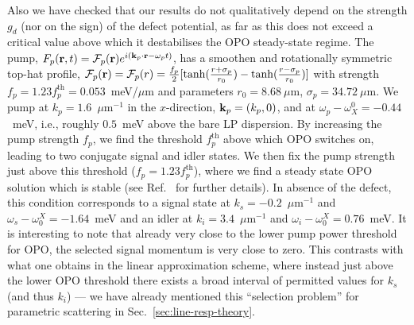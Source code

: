 Also we have checked that our results do not qualitatively depend on
the strength $g_d$ (nor on the sign) of the defect potential, as far
as this does not exceed a critical value above which it destabilises
the OPO steady-state regime.
%
The pump, $F_p(\mathbf{r},t) = \mathcal{F}_p(\mathbf{r}) e^{i (\mathbf{k}_p
  \cdot \mathbf{r} - \omega_p t)}$, has a smoothen and rotationally
symmetric top-hat profile, $\mathcal{F}_p(\mathbf{r}) = \mathcal{F}_p(r)
= \frac{f_p}{2}[\tanh(\frac{r+\sigma_p}{r_0}) -
  \tanh(\frac{r-\sigma_p}{r_0})]$ with strength $f_p = 1.23
f_p^\text{th} = 0.053$~meV/$\mu$m and parameters $r_0 = 8.68~\mu$m,
$\sigma_p = 34.72~\mu$m.
%
We pump at $k_p=1.6$~$\mu$m$^{-1}$ in the $x$-direction, $\mathbf{k}_p =
(k_p,0)$, and at $\omega_p-\omega_X^0=-0.44$~meV, i.e., roughly
$0.5$~meV above the bare LP dispersion. By increasing the pump
strength $f_p$, we find the threshold $f_p^{\text{th}}$ above which
OPO switches on, leading to two conjugate signal and idler states.
%
We then fix the pump strength just above this threshold ($f_p=1.23
f_p^{\text{th}}$), where we find a steady state OPO solution which is
stable (see Ref.~\cite{9783642241857} for further details). In
absence of the defect, this condition corresponds to a signal state at
$k_s=-0.2$~$\mu$m$^{-1}$ and $\omega_s-\omega_0^X = -1.64$~meV and an
idler at $k_i=3.4$~$\mu$m$^{-1}$ and $\omega_i-\omega_0^X =
0.76$~meV. 
%
It is interesting to note that already very close to the lower pump
power threshold for OPO, the selected signal momentum is very close to
zero. This contrasts with what one obtains in the linear approximation
scheme, where instead just above the lower OPO threshold there exists
a broad interval of permitted values for $k_s$ (and thus $k_i$) --- we
have already mentioned this ``selection problem'' for parametric
scattering in Sec.~\ref{sec:line-resp-theory}.

